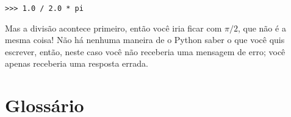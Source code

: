 \beforeverb
\begin{verbatim}
>>> 1.0 / 2.0 * pi
\end{verbatim}
\afterverb
%
Mas a divisão acontece primeiro, então você iria ficar com $\pi / 2$, que 
não é a mesma coisa! Não há nenhuma maneira de o Python 
saber o que você quis escrever, então, neste caso você não 
receberia uma mensagem de erro; você apenas receberia uma resposta errada.


\section{Glossário}


